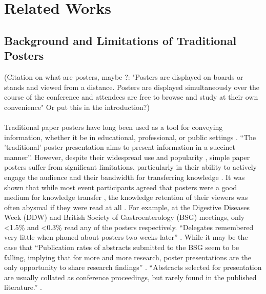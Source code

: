 \chapter{Related Works}
\label{sec:Related_Work}

\section{Background and Limitations of Traditional Posters}
(Citation on what are posters, maybe \cite{Soon}?: "Posters are displayed on boards or stands and viewed from a distance. Posters are displayed simultaneously over the course of the conference and attendees are free to browse and study at their own convenience" Or put this in the introduction?)\\\\

Traditional paper posters have long been used as a tool for conveying information, whether it be in educational, professional, or public settings \cite{Soon, IlicRowe3}. \enquote{The 'traditional' poster presentation aims to present information in a succinct manner}\cite{IlicRowe4}. However, despite their widespread use and popularity \cite{IlicRowe3}, simple paper posters suffer from significant limitations, particularly in their ability to actively engage the audience and their bandwidth for transferring knowledge \cite{IlicRowe1}. It was shown that while most event participants agreed that posters were a good medium for knowledge transfer \cite{Arslan, goodhand}, the knowledge retention of their viewers was often abysmal if they were read at all \cite{goodhand}. For example, at the Digestive Diseases Week (DDW) and British Society of Gastroenterology (BSG) meetings, only \textless1.5\% and \textless0.3\% read any of the posters respectively. \enquote{Delegates remembered very little when phoned about posters two weeks later} \cite{goodhand}. While it may be the case that \enquote{Publication rates of abstracts submitted to the BSG seem to be falling, implying that for more and more research, poster presentations are the only opportunity to share research findings} \cite{goodhand}. \enquote{Abstracts selected for presentation are usually collated as conference proceedings, but rarely found in the published literature.} \cite{Soon}. \\


